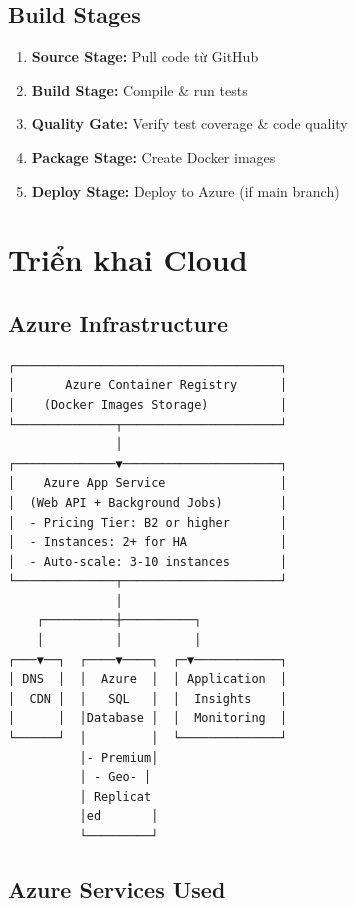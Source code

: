 \subsection{Build Stages}

\begin{enumerate}
    \item \textbf{Source Stage:} Pull code từ GitHub
    \item \textbf{Build Stage:} Compile \& run tests
    \item \textbf{Quality Gate:} Verify test coverage \& code quality
    \item \textbf{Package Stage:} Create Docker images
    \item \textbf{Deploy Stage:} Deploy to Azure (if main branch)
\end{enumerate}

\section{Triển khai Cloud}

\subsection{Azure Infrastructure}

\begin{verbatim}
┌─────────────────────────────────────┐
│       Azure Container Registry      │
│    (Docker Images Storage)          │
└──────────────┬──────────────────────┘
               │
┌──────────────▼──────────────────────┐
│    Azure App Service                │
│  (Web API + Background Jobs)        │
│  - Pricing Tier: B2 or higher       │
│  - Instances: 2+ for HA             │
│  - Auto-scale: 3-10 instances       │
└──────────────┬──────────────────────┘
               │
    ┌──────────┼──────────┐
    │          │          │
┌───▼──┐  ┌────▼────┐  ┌─▼────────────┐
│ DNS  │  │  Azure  │  │ Application  │
│  CDN │  │   SQL   │  │  Insights    │
│      │  │Database │  │  Monitoring  │
└──────┘  │         │  └──────────────┘
          │- Premium│
          │ - Geo- │
          │ Replicat
          │ed       │
          └─────────┘
\end{verbatim}

\subsection{Azure Services Used}

